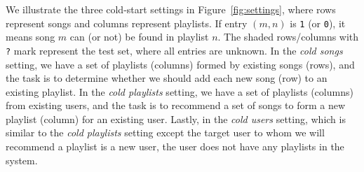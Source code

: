 We illustrate the three cold-start settings in Figure~\ref{fig:settings},
where rows represent songs and columns represent playlists.
If entry $(m, n)$ is \texttt{1} (or \texttt{0}), it means song $m$ can (or not) be found in playlist $n$.
The shaded rows/columns with \texttt{?} mark represent the test set, where all entries are unknown.
In the \emph{cold songs} setting, we have a set of playlists (columns) formed by existing songs (rows),
and the task is to determine whether we should add each new song (row) to an existing playlist.
In the \emph{cold playlists} setting, we have a set of playlists (columns) from existing users,
and the task is to recommend a set of songs to form a new playlist (column) for an existing user.
Lastly, in the \emph{cold users} setting, which is similar to the {\it cold playlists} setting except
the target user to whom we will recommend a playlist is a new user, \ie the user
does not have any playlists in the system.

